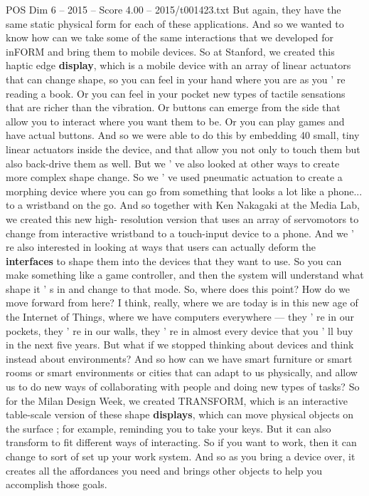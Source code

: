 \begin{textsample}{POS Dim 6 – 2015 – Score 4.00 – 2015/t001423.txt}
But again, they have the same static physical form for each of these applications.
And so we wanted to know how can we take some of the same interactions that we developed for inFORM and bring them to mobile devices.
So at Stanford, we created this haptic edge \textbf{display}, which is a mobile device with an array of linear actuators that can change shape, so you can feel in your hand where you are as you ' re reading a book.
Or you can feel in your pocket new types of tactile sensations that are richer than the vibration.
Or buttons can emerge from the side that allow you to interact where you want them to be.
Or you can play games and have actual buttons.
And so we were able to do this by embedding 40 small, tiny linear actuators inside the device, and that allow you not only to touch them but also back-drive them as well.
But we ' ve also looked at other ways to create more complex shape change.
So we ' ve used pneumatic actuation to create a morphing device where you can go from something that looks a lot like a phone... to a wristband on the go.
And so together with Ken Nakagaki at the Media Lab, we created this new high- resolution version that uses an array of servomotors to change from interactive wristband to a touch-input device to a phone.
And we ' re also interested in looking at ways that users can actually deform the \textbf{interfaces} to shape them into the devices that they want to use.
So you can make something like a game controller, and then the system will understand what shape it ' s in and change to that mode.
So, where does this point?
How do we move forward from here?
I think, really, where we are today is in this new age of the Internet of Things, where we have computers everywhere — they ' re in our pockets, they ' re in our walls, they ' re in almost every device that you ' ll buy in the next five years.
But what if we stopped thinking about devices and think instead about environments?
And so how can we have smart furniture or smart rooms or smart environments or cities that can adapt to us physically, and allow us to do new ways of collaborating with people and doing new types of tasks?
So for the Milan Design Week, we created TRANSFORM, which is an interactive table-scale version of these shape \textbf{displays}, which can move physical objects on the surface ; for example, reminding you to take your keys.
But it can also transform to fit different ways of interacting.
So if you want to work, then it can change to sort of set up your work system.
And so as you bring a device over, it creates all the affordances you need and brings other objects to help you accomplish those goals.

\end{textsample}
